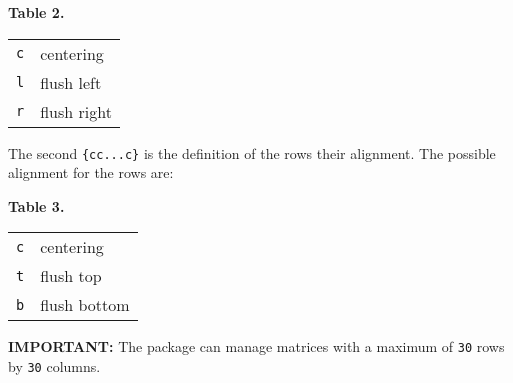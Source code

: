 \documentclass[a4paper,final,11pt]{article}
\begin{document}
\begin{dotlist}
  \begin{center}
    \par
    \textbf{Table 2.}\nobreak\\[1em]
    \begin{tabular}{|l|l|}
      \hline
      \verb|c| & centering \\
      \verb|l| & flush left \\
      \verb|r| & flush right \\
      \hline
    \end{tabular}
    \par
  \end{center}
  \item
  The second \verb|{cc...c}| is the definition of the rows their
  alignment.  The possible alignment for the rows are:
  \begin{center}
    \par
    \textbf{Table 3.}\nobreak\\[1em]
    \begin{tabular}{|l|l|}
      \hline
      \verb|c| & centering \\
      \verb|t| & flush top \\
      \verb|b| & flush bottom \\
      \hline
    \end{tabular}
    \par
  \end{center}
\end{dotlist}
%
%
%
\textbf{IMPORTANT:} The package can manage matrices with a maximum of
\verb|30| rows by \verb|30| columns.
\end{document}
